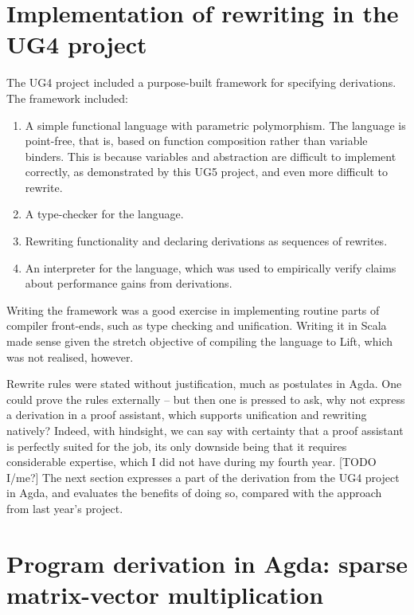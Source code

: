 \documentclass[bsc,frontabs,oneside,singlespacing,parskip,deptreport]{infthesis}
\theoremstyle{definition}
\theoremstyle{lemma}
\begin{document}
\section{Implementation of rewriting in the UG4 project}
\label{sec:impl-rewr-ug4}

The UG4 project included a purpose-built framework for specifying
derivations. The framework included:

\begin{enumerate}
\item A simple functional language with parametric polymorphism. The
  language is point-free, that is, based on function composition
  rather than variable binders. This is because variables and
  abstraction are difficult to implement correctly, as demonstrated by
  this UG5 project, and even more difficult to rewrite.

\item A type-checker for the language.

\item Rewriting functionality and declaring derivations as sequences of
  rewrites.

\item An interpreter for the language, which was used to empirically
  verify claims about performance gains from derivations.
\end{enumerate}

Writing the framework was a good exercise in implementing routine
parts of compiler front-ends, such as type checking and
unification. Writing it in Scala made sense given the stretch
objective of compiling the language to Lift, which was not realised,
however.

Rewrite rules were stated without justification, much as postulates in
Agda. One could prove the rules externally – but then one is pressed
to ask, why not express a derivation in a proof assistant, which
supports unification and rewriting natively? Indeed, with hindsight,
we can say with certainty that a proof assistant is perfectly suited
for the job, its only downside being that it requires considerable
expertise, which I did not have during my fourth year. [TODO I/me?]
The next section expresses a part of the derivation from the UG4
project in Agda, and evaluates the benefits of doing so, compared with
the approach from last year's project.

\section{Program derivation in Agda: sparse matrix-vector
  multiplication}
\label{sec:progr-deriv-agda}
\end{document}

